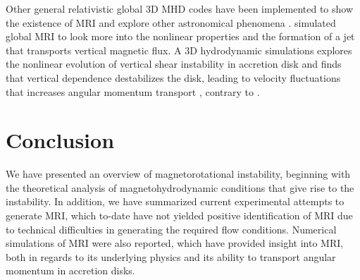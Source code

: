\documentclass{jfm}
\begin{document}
Other general relativistic global 3D MHD codes have been implemented to show
the existence of MRI and explore other astronomical phenomena
\citep{Villiers2003, Koide2000}. \cite{Kersale2006} simulated global MRI to
look more into the nonlinear properties and the formation of a jet that
transports vertical magnetic flux. A 3D hydrodynamic simulations explores the
nonlinear evolution of vertical shear instability in accretion disk and finds
that vertical dependence destabilizes the disk, leading to velocity
fluctuations that increases angular momentum transport \citep{Arlt2004},
contrary to \cite{Hawley1995}.



\section{Conclusion}
We have presented an overview of magnetorotational instability, beginning with
the theoretical analysis of magnetohydrodynamic conditions that give rise to
the instability. In addition, we have summarized current experimental attempts
to generate MRI, which to-date have not yielded positive identification of MRI
due to technical difficulties in generating the required flow conditions.
Numerical simulations of MRI were also reported, which have provided insight
into MRI, both in regards to its underlying physics and its ability to
transport angular momentum in accretion disks.





\end{document}
